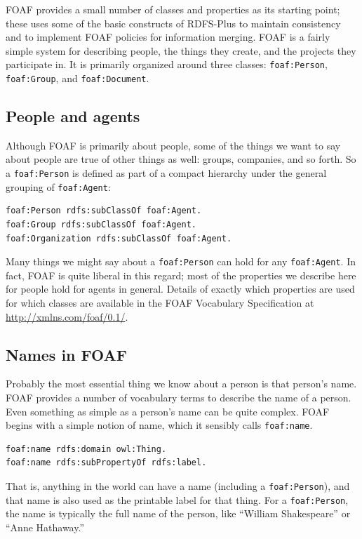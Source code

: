 FOAF provides a small number of classes and properties as its starting
point; these uses some of the basic constructs of RDFS-Plus to maintain
consistency and to implement FOAF policies for information merging. FOAF
is a fairly simple system for describing people, the things they create,
and the projects they participate in. It is primarily organized around
three classes: \texttt{foaf:Person}, \texttt{foaf:Group}, and \texttt{foaf:Document}.

\subsection{People and agents}

Although FOAF is primarily about people, some of the things we want to
say about people are true of other things as well: groups, companies,
and so forth. So a \texttt{foaf:Person} is defined as part of a compact hierarchy
under the general grouping of \texttt{foaf:Agent}:

\begin{lstlisting}
foaf:Person rdfs:subClassOf foaf:Agent.
foaf:Group rdfs:subClassOf foaf:Agent.
foaf:Organization rdfs:subClassOf foaf:Agent.
\end{lstlisting}

Many things we might say about a \texttt{foaf:Person} can hold for any
\texttt{foaf:Agent}. In fact, FOAF is quite liberal in this regard; most of the
properties we describe here for people hold for agents in general.
Details of exactly which properties are used for which classes are
available in the FOAF Vocabulary Specification at
\url{http://xmlns.com/foaf/0.1/}.

\subsection{Names in FOAF}

Probably the most essential thing we know about a person is that
person's name. FOAF provides a number of vocabulary terms to describe
the name of a person. Even something as simple as a person's name can be
quite complex. FOAF begins with a simple notion of name, which it
sensibly calls \texttt{foaf:name}.

\begin{lstlisting}
foaf:name rdfs:domain owl:Thing.
foaf:name rdfs:subPropertyOf rdfs:label.
\end{lstlisting}

That is, anything in the world can have a name (including a
\texttt{foaf:Person}), and that name is also used as the printable label for that
thing. For a \texttt{foaf:Person}, the name is typically the full name of the
person, like ``William Shakespeare'' or ``Anne Hathaway.''

